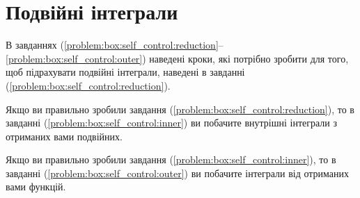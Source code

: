 \section{Подвійні інтеграли}
В завданнях (\ref{problem:box:self_control:reduction}--\ref{problem:box:self_control:outer}) наведені кроки, які потрібно зробити для того, щоб підрахувати подвійні інтеграли, наведені в завданні  (\ref{problem:box:self_control:reduction}).

Якщо ви правильно зробили завдання  (\ref{problem:box:self_control:reduction}), то в завданні (\ref{problem:box:self_control:inner}) ви побачите внутрішні інтеграли з отриманих вами подвійних.

Якщо ви правильно зробили завдання  (\ref{problem:box:self_control:inner}), то в завданні (\ref{problem:box:self_control:outer}) ви побачите інтеграли від отриманих вами функцій.

